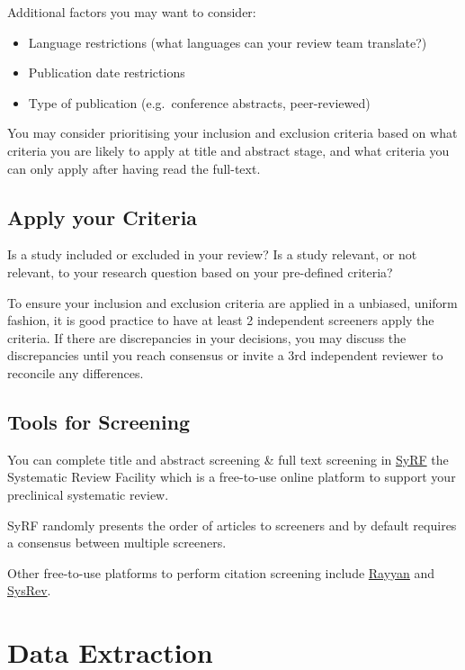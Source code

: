 \documentclass[
]{book}
\begin{document}
Additional factors you may want to consider:

\begin{itemize}
\item
  Language restrictions (what languages can your review team translate?)
\item
  Publication date restrictions
\item
  Type of publication (e.g.~conference abstracts, peer-reviewed)
\end{itemize}

You may consider prioritising your inclusion and exclusion criteria based on what criteria you are likely to apply at title and abstract stage, and what criteria you can only apply after having read the full-text.

\hypertarget{apply-your-criteria}{%
\section{Apply your Criteria}\label{apply-your-criteria}}

Is a study included or excluded in your review? Is a study relevant, or not relevant, to your research question based on your pre-defined criteria?

To ensure your inclusion and exclusion criteria are applied in a unbiased, uniform fashion, it is good practice to have at least 2 independent screeners apply the criteria. If there are discrepancies in your decisions, you may discuss the discrepancies until you reach consensus or invite a 3rd independent reviewer to reconcile any differences.

\hypertarget{tools-for-screening}{%
\section{Tools for Screening}\label{tools-for-screening}}

You can complete title and abstract screening \& full text screening in \href{http://syrf.org.uk/}{SyRF} the Systematic Review Facility which is a free-to-use online platform to support your preclinical systematic review.

SyRF randomly presents the order of articles to screeners and by default requires a consensus between multiple screeners.

Other free-to-use platforms to perform citation screening include \href{https://rayyan.qcri.org/welcome}{Rayyan} and \href{https://sysrev.com/}{SysRev}.

\hypertarget{data-extraction}{%
\chapter{Data Extraction}\label{data-extraction}}
\end{document}

